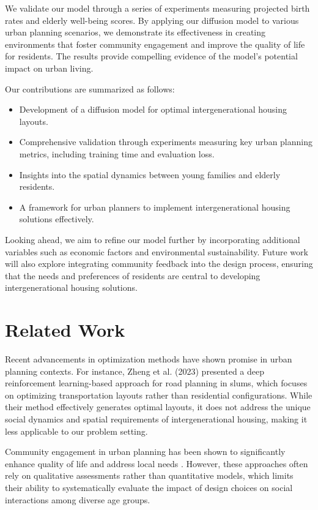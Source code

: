\documentclass{article} %
\begin{document}
We validate our model through a series of experiments measuring projected birth rates and elderly well-being scores. By applying our diffusion model to various urban planning scenarios, we demonstrate its effectiveness in creating environments that foster community engagement and improve the quality of life for residents. The results provide compelling evidence of the model's potential impact on urban living.

Our contributions are summarized as follows:
\begin{itemize}
    \item Development of a diffusion model for optimal intergenerational housing layouts.
    \item Comprehensive validation through experiments measuring key urban planning metrics, including training time and evaluation loss.
    \item Insights into the spatial dynamics between young families and elderly residents.
    \item A framework for urban planners to implement intergenerational housing solutions effectively.
\end{itemize}

Looking ahead, we aim to refine our model further by incorporating additional variables such as economic factors and environmental sustainability. Future work will also explore integrating community feedback into the design process, ensuring that the needs and preferences of residents are central to developing intergenerational housing solutions.

\section{Related Work}
\label{sec:related}
Recent advancements in optimization methods have shown promise in urban planning contexts. For instance, Zheng et al. (2023) presented a deep reinforcement learning-based approach for road planning in slums, which focuses on optimizing transportation layouts rather than residential configurations. While their method effectively generates optimal layouts, it does not address the unique social dynamics and spatial requirements of intergenerational housing, making it less applicable to our problem setting.

Community engagement in urban planning has been shown to significantly enhance quality of life and address local needs \citep{Buxens2024STEPBYSTEPMF}. However, these approaches often rely on qualitative assessments rather than quantitative models, which limits their ability to systematically evaluate the impact of design choices on social interactions among diverse age groups.
\end{document}
